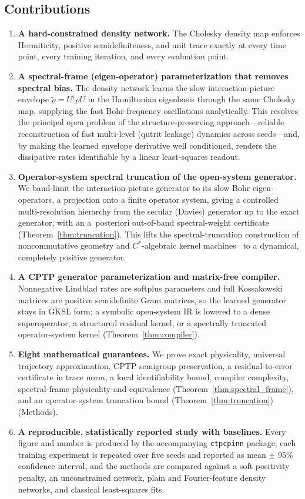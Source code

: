 \documentclass[11pt]{article}
\begin{document}
\subsection{Contributions}
\label{sec:contributions}

\begin{enumerate}[leftmargin=1.5em]
    \item \textbf{A hard-constrained density network.} The Cholesky density map enforces Hermiticity, positive semidefiniteness, and unit trace exactly at every time point, every training iteration, and every evaluation point.
    \item \textbf{A spectral-frame (eigen-operator) parameterization that removes spectral bias.} The density network learns the slow interaction-picture envelope $\widetilde\rho=U^\dagger\rho U$ in the Hamiltonian eigenbasis through the same Cholesky map, supplying the fast Bohr-frequency oscillations analytically. This resolves the principal open problem of the structure-preserving approach---reliable reconstruction of fast multi-level (qutrit leakage) dynamics across seeds---and, by making the learned envelope derivative well conditioned, renders the dissipative rates identifiable by a linear least-squares readout.
    \item \textbf{Operator-system spectral truncation of the open-system generator.} We band-limit the interaction-picture generator to its slow Bohr eigen-operators, a projection onto a finite operator system, giving a controlled multi-resolution hierarchy from the secular (Davies) generator up to the exact generator, with an a~posteriori out-of-band spectral-weight certificate (Theorem~\ref{thm:truncation}). This lifts the spectral-truncation construction of noncommutative geometry and $C^*$-algebraic kernel machines~\cite{connes2021spectral,hashimoto2024spectral} to a dynamical, completely positive generator.
    \item \textbf{A CPTP generator parameterization and matrix-free compiler.} Nonnegative Lindblad rates are softplus parameters and full Kossakowski matrices are positive semidefinite Gram matrices, so the learned generator stays in GKSL form; a symbolic open-system IR is lowered to a dense superoperator, a structured residual kernel, or a spectrally truncated operator-system kernel (Theorem~\ref{thm:compiler}).
    \item \textbf{Eight mathematical guarantees.} We prove exact physicality, universal trajectory approximation, CPTP semigroup preservation, a residual-to-error certificate in trace norm, a local identifiability bound, compiler complexity, spectral-frame physicality-and-equivalence (Theorem~\ref{thm:spectral_frame}), and an operator-system truncation bound (Theorem~\ref{thm:truncation}) (Methods).
    \item \textbf{A reproducible, statistically reported study with baselines.} Every figure and number is produced by the accompanying \texttt{ctpcpinn} package; each training experiment is repeated over five seeds and reported as mean $\pm$ 95\% confidence interval, and the methods are compared against a soft positivity penalty, an unconstrained network, plain and Fourier-feature density networks, and classical least-squares fits.
\end{enumerate}
\end{document}
